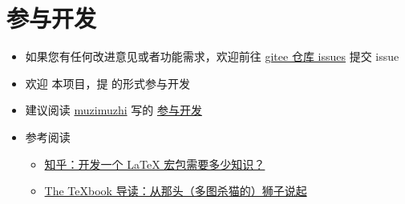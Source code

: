 
\section{参与开发}

\begin{itemize}
  \item 如果您有任何改进意见或者功能需求，欢迎前往 \href{https://gitee.com/xkwxdyy/exam-zh/issues}{gitee 仓库 issues} 提交 issue
  \item 欢迎  本项目，提  的形式参与开发
  \item 建议阅读 \href{https://zhuanlan.zhihu.com/typography-and-latex/}{muzimuzhi} 写的 \href{https://gitee.com/ustctug/ustcthesis/wiki/%E5%8F%82%E4%B8%8E%E5%BC%80%E5%8F%91}{参与开发}
  \item 参考阅读
    \begin{itemize}
      \item \href{https://www.zhihu.com/question/27017364/answer/34932199}{知乎：开发一个 LaTeX 宏包需要多少知识？}
      \item \href{https://zhuanlan.zhihu.com/p/19669122}{The TeXbook 导读：从那头（多图杀猫的）狮子说起}
    \end{itemize}
\end{itemize}